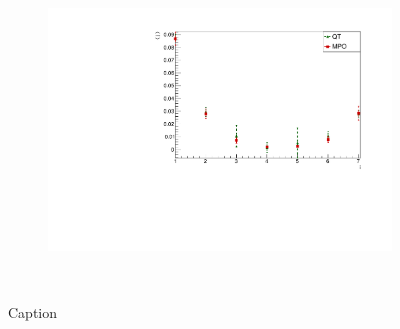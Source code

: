 \begin{figure}
\begin{subfigure}{\columnwidth}
        \includegraphics[scale=0.5]{Figures/SpinCurrComparison_8sJ10515.pdf}
        \label{fig:SpinCurrComparison_8sJ10515}
        \end{subfigure}\\
    \caption{Caption}
    \label{fig:my_label}
\end{figure}